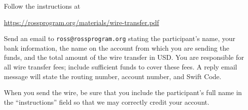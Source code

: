 \documentclass[11pt]{ross}
\begin{document}
Follow the instructions at
\begin{center}
\url{https://rossprogram.org/materials/wire-transfer.pdf}
\end{center}

Send an email to \texttt{ross@rossprogram.org} stating the
participant's name, your bank information, the name on the account
from which you are sending the funds, and the total amount of the wire
transfer in USD. You are responsible for all wire transfer fees;
include sufficient funds to cover these fees.  A reply email message
will state the routing number, account number, and Swift Code.

When you send the wire, be sure that you include the participant's
full name in the ``instructions'' field so that we may correctly
credit your account.
\end{document}
